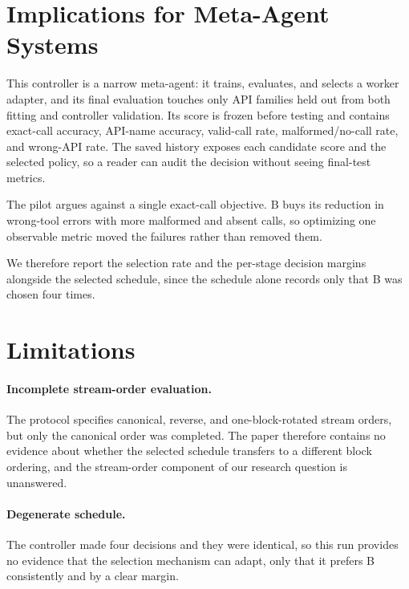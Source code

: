 \documentclass{article}
\begin{document}
\section{Implications for Meta-Agent Systems}

This controller is a narrow meta-agent: it trains, evaluates, and selects a worker adapter, and its final evaluation touches only API families held out from both fitting and controller validation. Its score is frozen before testing and contains exact-call accuracy, API-name accuracy, valid-call rate, malformed/no-call rate, and wrong-API rate. The saved history exposes each candidate score and the selected policy, so a reader can audit the decision without seeing final-test metrics.

The pilot argues against a single exact-call objective. B buys its reduction in wrong-tool errors with more malformed and absent calls, so optimizing one observable metric moved the failures rather than removed them.

We therefore report the selection rate and the per-stage decision margins alongside the selected schedule, since the schedule alone records only that B was chosen four times.

\section{Limitations}
\label{sec:limitations}

\paragraph{Incomplete stream-order evaluation.}
The protocol specifies canonical, reverse, and one-block-rotated stream orders, but only the canonical order was completed. The paper therefore contains no evidence about whether the selected schedule transfers to a different block ordering, and the stream-order component of our research question is unanswered.

\paragraph{Degenerate schedule.}
The controller made four decisions and they were identical, so this run provides no evidence that the selection mechanism can adapt, only that it prefers B consistently and by a clear margin.
\end{document}
